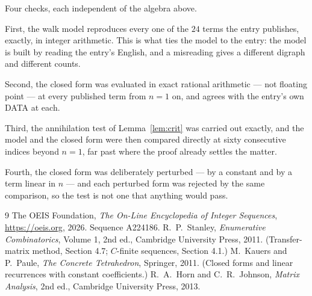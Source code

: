 \documentclass[11pt,a4paper]{article}
\theoremstyle{plain}
\theoremstyle{definition}
\begin{document}
Four checks, each independent of the algebra above.

First, the walk model reproduces every one of the $24$ terms the entry publishes,
exactly, in integer arithmetic. This is what ties the model to the entry: the model is built
by reading the entry's English, and a misreading gives a different digraph and different
counts.

Second, the closed form was evaluated in exact rational arithmetic --- not floating point ---
at every published term from $n=1$ on, and agrees with the entry's own DATA at each.

Third, the annihilation test of Lemma~\ref{lem:crit} was carried out exactly, and the model
and the closed form were then compared directly at sixty consecutive indices beyond
$n=1$, far past where the proof already settles the matter.

Fourth, the closed form was deliberately perturbed --- by a constant and by a term linear in
$n$ --- and each perturbed form was rejected by the same comparison, so the test is not one
that anything would pass.

\begin{thebibliography}{9}
 The OEIS Foundation, \emph{The On-Line Encyclopedia of Integer
Sequences}, \url{https://oeis.org}, 2026. Sequence A224186.
 R.~P.~Stanley, \emph{Enumerative Combinatorics}, Volume 1, 2nd ed.,
Cambridge University Press, 2011. (Transfer-matrix method, Section 4.7; $C$-finite sequences,
Section 4.1.)
 M.~Kauers and P.~Paule, \emph{The Concrete Tetrahedron}, Springer, 2011.
(Closed forms and linear recurrences with constant coefficients.)
 R.~A.~Horn and C.~R.~Johnson, \emph{Matrix Analysis}, 2nd ed., Cambridge
University Press, 2013.
\end{thebibliography}
\end{document}
